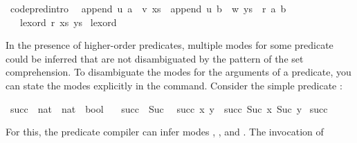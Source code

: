 \begin{isabellebody}
\isamarkupfalse%
\ {\isacharbrackleft}code{\isacharunderscore}pred{\isacharunderscore}intro{\isacharbrackright}{\isacharcolon}\isanewline
\ \ {\isachardoublequoteopen}append\ u\ {\isacharparenleft}a\ {\isacharhash}\ v{\isacharparenright}\ xs\ {\isasymLongrightarrow}\ append\ u\ {\isacharparenleft}b\ {\isacharhash}\ w{\isacharparenright}\ ys\ {\isasymLongrightarrow}\ r\ {\isacharparenleft}a{\isacharcomma}\ b{\isacharparenright}\isanewline
\ \ {\isasymLongrightarrow}\ lexord\ r\ {\isacharparenleft}xs{\isacharcomma}\ ys{\isacharparenright}{\isachardoublequoteclose}\isanewline
{}\isamarkupfalse%
\ lexord%
\endisatagquote
{\isafoldquote}%
%
\isadelimquote
%
\endisadelimquote
%
\isamarkuptrue%
%
\begin{isamarkuptext}%
In the presence of higher-order predicates, multiple modes for some
  predicate could be inferred that are not disambiguated by the
  pattern of the set comprehension.  To disambiguate the modes for the
  arguments of a predicate, you can state the modes explicitly in the
  \hyperlink{command.values}{\mbox{}} command.  Consider the simple predicate :%
\end{isamarkuptext}%
\isamarkuptrue%
%
\isadelimquote
%
\endisadelimquote
%
\isatagquote
{}\isamarkupfalse%
\ succ\ {\isacharcolon}{\isacharcolon}\ {\isachardoublequoteopen}nat\ {\isasymRightarrow}\ nat\ {\isasymRightarrow}\ bool{\isachardoublequoteclose}\ \isanewline
\ \ {\isachardoublequoteopen}succ\ {}\ {\isacharparenleft}Suc\ {}{\isacharparenright}{\isachardoublequoteclose}\isanewline
{\isacharbar}\ {\isachardoublequoteopen}succ\ x\ y\ {\isasymLongrightarrow}\ succ\ {\isacharparenleft}Suc\ x{\isacharparenright}\ {\isacharparenleft}Suc\ y{\isacharparenright}{\isachardoublequoteclose}\isanewline
\isanewline
{}\isamarkupfalse%
\ succ\ \isacommand{{\isachardot}}\isamarkupfalse%
%
\endisatagquote
{\isafoldquote}%
%
\isadelimquote
%
\endisadelimquote
%
\begin{isamarkuptext}%
\noindent For this, the predicate compiler can infer modes , ,  and
  .  The invocation of \hyperlink{command.values}{\mbox{}}

\end{isamarkuptext}
\end{isabellebody}
